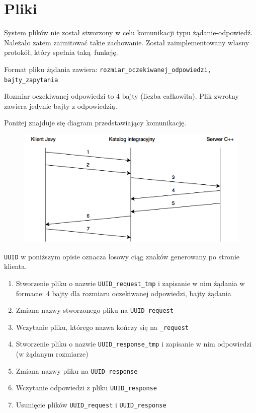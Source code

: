 \section{Pliki}

System plików nie został stworzony w celu komunikacji typu żądanie-odpowiedź. Należało zatem zaimitować takie zachowanie. Został zaimplementowany własny protokół, który spełnia taką funkcję.

Format pliku żądania zawiera:
\newline
\texttt{rozmiar\_oczekiwanej\_odpowiedzi, bajty\_zapytania}

Rozmiar oczekiwanej odpowiedzi to 4 bajty (liczba całkowita). Plik zwrotny zawiera jedynie bajty z odpowiedzią.

Poniżej znajduje się diagram przedstawiający komunikację.

\begin{figure}[h!]
    \centering
    \includegraphics[width=\textwidth,height=\textheight,keepaspectratio]{img/files_impl_diagram.png}
    \caption{}
\end{figure}

\texttt{UUID} w poniższym opisie oznacza losowy ciąg znaków generowany po stronie klienta.
\begin{enumerate}
    \item Stworzenie pliku o nazwie \texttt{UUID\_request\_tmp} i zapisanie w nim żądania w formacie: 4 bajty dla rozmiaru oczekiwanej odpowiedzi, bajty żądania
    \item Zmiana nazwy stworzonego pliku na \texttt{UUID\_request}
    \item Wczytanie pliku, którego nazwa kończy się na \texttt{\_request}
    \item Stworzenie pliku o nazwie \texttt{UUID\_response\_tmp} i zapisanie w nim odpowiedzi (w żądanym rozmiarze)
    \item Zmiana nazwy pliku na \texttt{UUID\_response}
    \item Wczytanie odpowiedzi z pliku \texttt{UUID\_response}
    \item Usunięcie plików \texttt{UUID\_request} i \texttt{UUID\_response}
\end{enumerate}

